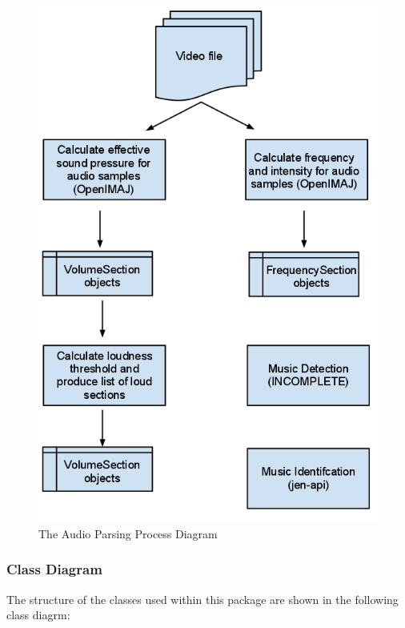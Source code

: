 \begin{figure}[h1]
\begin{center}
 \includegraphics[trim = 0mm 0mm 0mm 0mm, clip,
 scale=0.4]{Images/Audioparsingprocess.png}
  \caption{The Audio Parsing Process Diagram}
 \end{center}
\end{figure}

\newpage

\subsubsection{Class Diagram}
The structure of the classes used within this package are shown in the following class diagrm:

